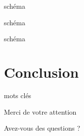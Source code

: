 \documentclass[french]{beamer}
\begin{document}
\begin{frame}
    schéma

\end{frame}


\begin{frame}
    schéma

\end{frame}


\begin{frame}
    schéma

\end{frame}

\section{Conclusion}

\begin{frame}




    mots clés

\end{frame}

\begin{frame}
    \center
    \Huge Merci de votre attention
    
    Avez-vous des questions ?
\end{frame}
\end{document}
